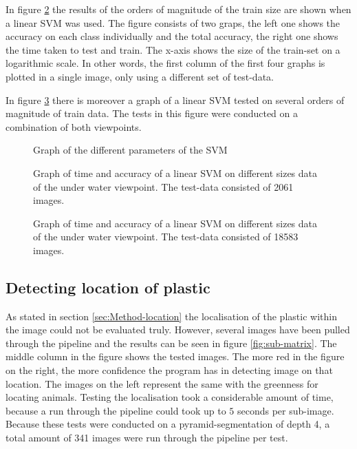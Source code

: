 In figure \ref{fig:lin1} the results of the orders of magnitude of the train size are shown when a linear SVM was used. The figure consists of two graps, the left one shows the accuracy on each class individually and the total accuracy, the right one shows the time taken to test and train. The x-axis shows the size of the train-set on a logarithmic scale.
In other words, the first column of the first four graphs is plotted in a single image, only using a different set of test-data.

In figure \ref{fig:lin2} there is moreover a graph of a linear SVM tested on several orders of magnitude of train data.
The tests in this figure were conducted on a combination of both viewpoints.

\begin{figure}[h!tb]
\centering
\ifx\showfig\undefined
 


 \fi
\caption{Graph of the different parameters of the SVM}
\label{fig:c14}
\end{figure}

\begin{figure}[h!tb]
\centering
\ifx\showfig\undefined
 \fi
\caption{Graph of time and accuracy of a linear SVM on different sizes data of the under water viewpoint. The test-data consisted of 2061 images.}
\label{fig:lin1}
\end{figure}

\begin{figure}[h!tb]
\centering
\ifx\showfig\undefined
 \fi
\caption{Graph of time and accuracy of a linear SVM on different sizes data of the under water viewpoint. The test-data consisted of 18583 images.}
\label{fig:lin2}
\end{figure}

\subsection{Detecting location of plastic}
\label{sec:Results-location}
As stated in section \ref{sec:Method-location} the localisation of the plastic within the image could not be evaluated truly.
However, several images have been pulled through the pipeline and the results can be seen in figure \ref{fig:sub-matrix}.
The middle column in the figure shows the tested images.
The more red in the figure on the right, the more confidence the program has in detecting image on that location.
The images on the left represent the same with the greenness for locating animals.
Testing the localisation took a considerable amount of time, because a run through the pipeline could took up to $5$ seconds per sub-image.
Because these tests were conducted on a pyramid-segmentation of depth 4, a total amount of 341 images were run through the pipeline per test.

